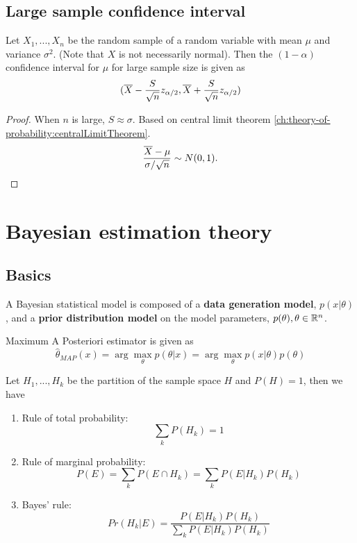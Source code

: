 \begin{refsection}
\subsection{Large sample confidence interval}
\begin{lemma}\cite[220]{hoggintroduction}
Let $X_1,...,X_n$ be the random sample of a random variable with mean $\mu$ and variance $\sigma^2$. (Note that $X$ is not necessarily normal). Then the $(1-\alpha)$ confidence interval for $\mu$ for large sample size is given as
	$$(\overline{X} - \frac{S}{\sqrt{n}}z_{\alpha/2},\overline{X} + \frac{S}{\sqrt{n}}z_{\alpha/2})$$
\end{lemma}
\begin{proof}
When $n$ is large, $S \approx \sigma$. Based on central limit theorem \autoref{ch:theory-of-probability:centralLimitTheorem}.
$$\frac{\overline{X} - \mu}{\sigma/\sqrt{n}} \sim N(0,1).$$
\end{proof}




\section{Bayesian estimation theory}
\subsection{Basics}
\begin{definition}
	A Bayesian statistical model is composed of a \textbf{data generation model}, $p(x|\theta)$, and a \textbf{prior distribution model} on the model parameters, $p(\theta),\theta\in \mathbb{R}^n$. 
\end{definition}


\begin{definition}
	Maximum A Posteriori estimator is given as
	$$\hat{\theta}_{MAP}(x) = \arg\max_{\theta} p(\theta|x) = \arg\max_{\theta} p(x|\theta)p(\theta)$$
\end{definition}


\begin{lemma}\cite[15]{hoff2009first}\hfill
	Let $H_1,...,H_k$ be the partition of the sample space $H$ and $P(H) = 1$, then we have
	\begin{enumerate}
		\item Rule of total probability:
		$$\sum_k P(H_k) = 1$$
		\item Rule of marginal probability:
		$$P(E) = \sum_k P(E\cap H_k) = \sum_k P(E|H_k)P(H_k)$$
		\item Bayes' rule:
		$$Pr(H_k|E) = \frac{P(E|H_k)P(H_k)}{\sum_k P(E|H_k)P(H_k)}$$    
	\end{enumerate}
	

\end{lemma}
\end{refsection}
